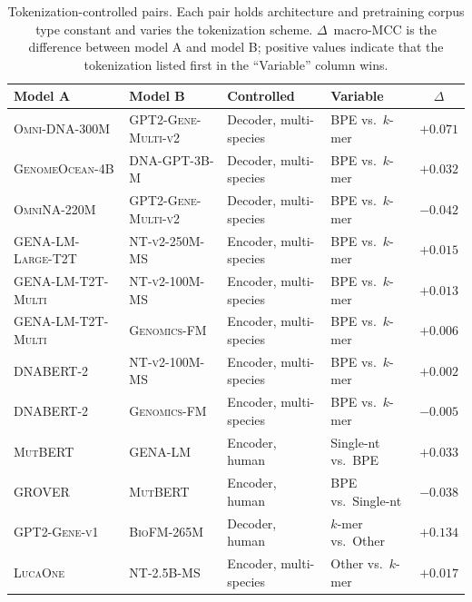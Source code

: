 \documentclass{llmxive}
\begin{document}
\begin{table}[t]
\centering
\small
\begin{tabular}{@{}llllc@{}}
\toprule
\textbf{Model A} & \textbf{Model B} & \textbf{Controlled} & \textbf{Variable} & \textbf{$\Delta$} \\
\midrule
\textsc{Omni-DNA-300M}      & \textsc{GPT2-Gene-Multi-v2} & Decoder, multi-species & BPE vs.\ $k$-mer        & $+0.071$ \\
\textsc{GenomeOcean-4B}     & \textsc{DNA-GPT-3B-M}       & Decoder, multi-species & BPE vs.\ $k$-mer        & $+0.032$ \\
\textsc{OmniNA-220M}        & \textsc{GPT2-Gene-Multi-v2} & Decoder, multi-species & BPE vs.\ $k$-mer        & $-0.042$ \\
\midrule
\textsc{GENA-LM-Large-T2T}  & \textsc{NT-v2-250M-MS}      & Encoder, multi-species & BPE vs.\ $k$-mer        & $+0.015$ \\
\textsc{GENA-LM-T2T-Multi}  & \textsc{NT-v2-100M-MS}      & Encoder, multi-species & BPE vs.\ $k$-mer        & $+0.013$ \\
\textsc{GENA-LM-T2T-Multi}  & \textsc{Genomics-FM}        & Encoder, multi-species & BPE vs.\ $k$-mer        & $+0.006$ \\
\textsc{DNABERT-2}          & \textsc{NT-v2-100M-MS}      & Encoder, multi-species & BPE vs.\ $k$-mer        & $+0.002$ \\
\textsc{DNABERT-2}          & \textsc{Genomics-FM}        & Encoder, multi-species & BPE vs.\ $k$-mer        & $-0.005$ \\
\midrule
\textsc{MutBERT}            & \textsc{GENA-LM}            & Encoder, human         & Single-nt vs.\ BPE      & $+0.033$ \\
\textsc{GROVER}             & \textsc{MutBERT}            & Encoder, human         & BPE vs.\ Single-nt      & $-0.038$ \\
\midrule
\textsc{GPT2-Gene-v1}       & \textsc{BioFM-265M}         & Decoder, human         & $k$-mer vs.\ Other      & $+0.134$ \\
\textsc{LucaOne}            & \textsc{NT-2.5B-MS}         & Encoder, multi-species & Other vs.\ $k$-mer      & $+0.017$ \\
\bottomrule
\end{tabular}
\caption{Tokenization-controlled pairs. Each pair holds architecture
and pretraining corpus type constant and varies the tokenization
scheme. $\Delta$~macro-MCC is the difference between model A and
model B; positive values indicate that the tokenization listed first
in the ``Variable'' column wins.}
\label{tab:pairs_tokenization}
\end{table}
\end{document}
